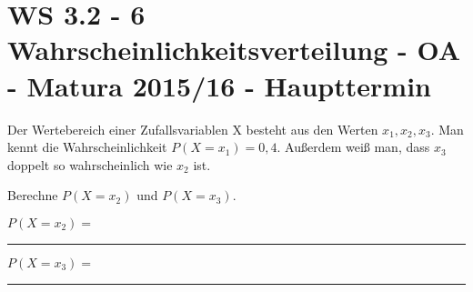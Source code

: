 \section{WS 3.2 - 6 Wahrscheinlichkeitsverteilung - OA - Matura 2015/16 - Haupttermin}

\begin{beispiel}[WS 3.2]{1} %
Der Wertebereich einer Zufallsvariablen X besteht aus den Werten $x_1, x_2, x_3$.
Man kennt die Wahrscheinlichkeit $P(X = x_1) = 0,4$. Außerdem weiß man, dass $x_3$ doppelt so wahrscheinlich wie $x_2$ ist. \leer

Berechne $P(X=x_2)$ und $P(X=x_3)$. \leer

$P(X=x_2)=$ \rule{5cm}{0.3pt} \leer

$P(X=x_3)=$ \rule{5cm}{0.3pt} \leer


\end{beispiel}